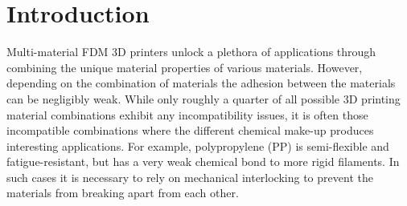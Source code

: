 \section{Introduction}
Multi-material FDM 3D printers unlock a plethora of applications through combining the unique material properties of various materials.
However, depending on the combination of materials the adhesion between the materials can be negligibly weak.
While only roughly a quarter of all possible 3D printing material combinations exhibit any incompatibility issues,
it is often those incompatible combinations where the different chemical make-up produces interesting applications.
For example, polypropylene (PP) is semi-flexible and fatigue-resistant, but has a very weak chemical bond to more rigid filaments.
In such cases it is necessary to rely on mechanical interlocking to prevent the materials from breaking apart from each other.



